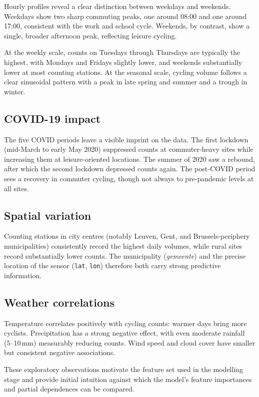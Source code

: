 \documentclass[11pt,a4paper]{article}
\begin{document}
Hourly profiles reveal a clear distinction between weekdays and
weekends. Weekdays show two sharp commuting peaks, one around 08:00
and one around 17:00, consistent with the work and school cycle.
Weekends, by contrast, show a single, broader afternoon peak,
reflecting leisure cycling.

At the weekly scale, counts on Tuesdays through Thursdays are typically
the highest, with Mondays and Fridays slightly lower, and weekends
substantially lower at most counting stations. At the seasonal scale,
cycling volume follows a clear sinusoidal pattern with a peak in late
spring and summer and a trough in winter.

\subsection{COVID-19 impact}

The five COVID periods leave a visible imprint on the data. The first
lockdown (mid-March to early May 2020) suppressed counts at
commuter-heavy sites while increasing them at leisure-oriented
locations. The summer of 2020 saw a rebound, after which the second
lockdown depressed counts again. The post-COVID period sees a recovery
in commuter cycling, though not always to pre-pandemic levels at all
sites.

\subsection{Spatial variation}

Counting stations in city centres (notably Leuven, Gent, and
Brussels-periphery municipalities) consistently record the highest
daily volumes, while rural sites record substantially lower counts. The
municipality (\textit{gemeente}) and the precise location of the sensor
(\texttt{lat}, \texttt{lon}) therefore both carry strong predictive
information.

\subsection{Weather correlations}

Temperature correlates positively with cycling counts: warmer days
bring more cyclists. Precipitation has a strong negative effect, with
even moderate rainfall (5--10\,mm) measurably reducing counts. Wind
speed and cloud cover have smaller but consistent negative
associations.

These exploratory observations motivate the feature set used in the
modelling stage and provide initial intuition against which the
model's feature importances and partial dependences can be compared.
\end{document}

